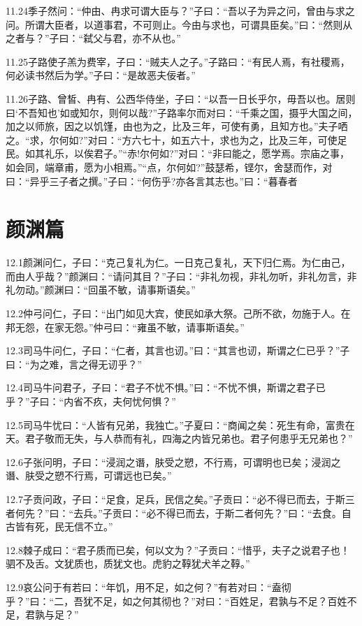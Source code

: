 \documentclass[a4paper,12pt,UTF8,twoside]{ctexbook}
\begin{document}
11.24季子然问：“仲由、冉求可谓大臣与？”子曰：“吾以子为异之问，曾由与求之问。所谓大臣者，以道事君，不可则止。今由与求也，可谓具臣矣。”曰：“然则从之者与？”子曰：“弑父与君，亦不从也。”

11.25子路使子羔为费宰，子曰：“贼夫人之子。”子路曰：“有民人焉，有社稷焉，何必读书然后为学。”子曰：“是故恶夫佞者。”

11.26子路、曾皙、冉有、公西华侍坐，子曰：“以吾一日长乎尔，毋吾以也。居则曰‘不吾知也’如或知尔，则何以哉?”子路率尔而对曰：“千乘之国，摄乎大国之间，加之以师旅，因之以饥馑，由也为之，比及三年，可使有勇，且知方也。”夫子哂之。“求，尔何如?”对曰：“方六七十，如五六十，求也为之，比及三年，可使足民。如其礼乐，以俟君子。”“赤!尔何如?”对曰：“非曰能之，愿学焉。宗庙之事，如会同，端章甫，愿为小相焉。”“点，尔何如?”鼓瑟希，铿尔，舍瑟而作，对曰：“异乎三子者之撰。”子曰：“何伤乎?亦各言其志也。”曰：“暮春者

\chapter{颜渊篇}
12.1颜渊问仁，子曰：“克己复礼为仁。一日克己复礼，天下归仁焉。为仁由己，而由人乎哉？”颜渊曰：“请问其目？”子曰：“非礼勿视，非礼勿听，非礼勿言，非礼勿动。”颜渊曰：“回虽不敏，请事斯语矣。”

12.2仲弓问仁，子曰：“出门如见大宾，使民如承大祭。己所不欲，勿施于人。在邦无怨，在家无怨。”仲弓曰：“雍虽不敏，请事斯语矣。”

12.3司马牛问仁，子曰：“仁者，其言也讱。”曰：“其言也讱，斯谓之仁已乎？”子曰：“为之难，言之得无讱乎？”

12.4司马牛问君子，子曰：“君子不忧不惧。”曰：“不忧不惧，斯谓之君子已乎？”子曰：“内省不疚，夫何忧何惧？”

12.5司马牛忧曰：“人皆有兄弟，我独亡。”子夏曰：“商闻之矣：死生有命，富贵在天。君子敬而无失，与人恭而有礼，四海之内皆兄弟也。君子何患乎无兄弟也？”

12.6子张问明，子曰：“浸润之谮，肤受之愬，不行焉，可谓明也已矣；浸润之谮、肤受之愬不行焉，可谓远也已矣。”

12.7子贡问政，子曰：“足食，足兵，民信之矣。”子贡曰：“必不得已而去，于斯三者何先？”曰：“去兵。”子贡曰：“必不得已而去，于斯二者何先？”曰：“去食。自古皆有死，民无信不立。”

12.8棘子成曰：“君子质而已矣，何以文为？”子贡曰：“惜乎，夫子之说君子也！驷不及舌。文犹质也，质犹文也。虎豹之鞟犹犬羊之鞟。”

12.9哀公问于有若曰：“年饥，用不足，如之何？”有若对曰：“盍彻乎？”曰：“二，吾犹不足，如之何其彻也？”对曰：“百姓足，君孰与不足？百姓不足，君孰与足？”
\end{document}
